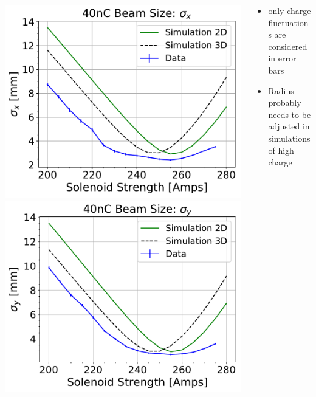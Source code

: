 \documentclass[professionalfonts,t]{beamer}
\begin{document}
{\begin{frame}[t]
\begin{columns}[T]
\begin{column}{0.76\textwidth}
\begin{minipage}{0.5\textheight}
	\includegraphics[width=1.0\linewidth]{../../tex/images/xbeamsizes_high_charge_sol_scan_10-17-2017}
	\includegraphics[width=1.0\linewidth]{../../tex/images/ybeamsizes_high_charge_sol_scan_10-17-2017}
\end{minipage}
\end{column}
\begin{column}{0.4\textwidth}
\begin{itemize}
	\item only charge fluctuations are considered in error bars 
	\item Radius probably needs to be adjusted in simulations of high charge
\end{itemize}
\end{column}
\end{columns}
\end{frame}

}
\end{document}

